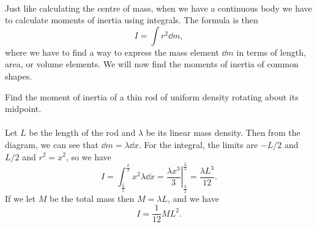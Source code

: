 \documentclass[../classical_mechanics.tex]{subfiles}
\begin{document}
        \paragraph{}
        Just like calculating the centre of mass, when we have a continuous body we have to calculate moments of inertia using integrals.
        The formula is then
        \begin{equation}
            I=\int r^2\dd{m},
        \end{equation}
        where we have to find a way to express the mass element $\dd{m}$ in terms of length, area, or volume elements. 
        We will now find the moments of inertia of common shapes.
        \begin{example}
            Find the moment of inertia of a thin rod of uniform density rotating about its midpoint.
                    

            \paragraph{}
            Let $L$ be the length of the rod and $\lambda$ be its linear mass density.
            Then from the diagram, we can see that $\dd{m}=\lambda\dd{x}$.
            For the integral, the limits are $-L/2$ and $L/2$ and $r^2=x^2$, so we have
            \begin{equation}
                I=\int_{\frac{L}{2}}^{\frac{L}{2}}x^2\lambda\dd{x}=\left.\frac{\lambda x^3}{3}\right|_{\frac{L}{2}}^{\frac{L}{2}}=\frac{\lambda L^3}{12}.
            \end{equation}
            If we let $M$ be the total mass then $M=\lambda L$, and we have
            \begin{equation}
                I=\frac{1}{12}ML^2.
            \end{equation}
        \end{example}
\end{document}
